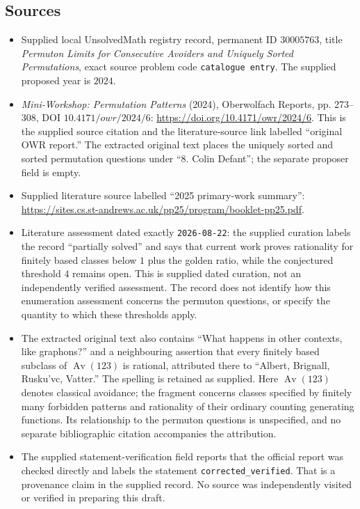 \documentclass[11pt]{article}
\begin{document}
\subsection{Sources}
\begin{itemize}
\item Supplied local UnsolvedMath registry record, permanent ID \(30005763\), title \emph{Permuton Limits for Consecutive Avoiders and Uniquely Sorted Permutations}, exact source problem code \texttt{catalogue entry}. The supplied proposed year is \(2024\).
\item \emph{Mini-Workshop: Permutation Patterns} (2024), Oberwolfach Reports, pp. 273--308, DOI \(10.4171/owr/2024/6\): \url{https://doi.org/10.4171/owr/2024/6}. This is the supplied source citation and the literature-source link labelled ``original OWR report.'' The extracted original text places the uniquely sorted and sorted permutation questions under ``8. Colin Defant''; the separate proposer field is empty.
\item Supplied literature source labelled ``2025 primary-work summary'': \url{https://sites.cs.st-andrews.ac.uk/pp25/program/booklet-pp25.pdf}.
\item Literature assessment dated exactly \texttt{2026-08-22}: the supplied curation labels the record ``partially solved'' and says that current work proves rationality for finitely based classes below \(1\) plus the golden ratio, while the conjectured threshold \(4\) remains open. This is supplied dated curation, not an independently verified assessment. The record does not identify how this enumeration assessment concerns the permuton questions, or specify the quantity to which these thresholds apply.
\item The extracted original text also contains ``What happens in other contexts, like graphons?'' and a neighbouring assertion that every finitely based subclass of \(\operatorname{Av}(123)\) is rational, attributed there to ``Albert, Brignall, Rusku’vc, Vatter.'' The spelling is retained as supplied. Here \(\operatorname{Av}(123)\) denotes classical avoidance; the fragment concerns classes specified by finitely many forbidden patterns and rationality of their ordinary counting generating functions. Its relationship to the permuton questions is unspecified, and no separate bibliographic citation accompanies the attribution.
\item The supplied statement-verification field reports that the official report was checked directly and labels the statement \texttt{corrected\_verified}. That is a provenance claim in the supplied record. No source was independently visited or verified in preparing this draft.
\end{itemize}
\end{document}
